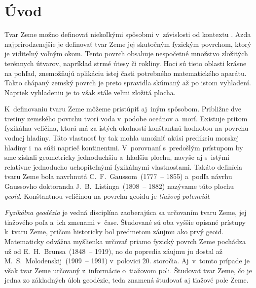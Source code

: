 \documentclass[a4paper, 12pt]{book}
\begin{document}
\tableofcontents
\newpage







\chapter*{Úvod}
\label{sec:introduction}

Tvar Zeme možno definovať niekoľkými spôsobmi v~závislosti od kontextu 
\parencite{MoritzTheFigureOfTheEarth}.  Azda najprirodzenejšie je definovať 
tvar Zeme jej skutočným fyzickým povrchom, ktorý je viditeľný voľným okom.  
Tento povrch obsahuje nespočetné množstvo zložitých terénnych útvarov, 
napríklad strmé útesy či rokliny.  Hoci sú tieto oblasti krásne na pohľad, 
znemožňujú aplikáciu istej časti potrebného matematického aparátu.  Takto 
chápaný zemský povrch je preto spravidla skúmaný až po istom vyhladení.  
Napriek vyhladeniu je to však stále veľmi zložitá plocha.

K~definovaniu tvaru Zeme môžeme pristúpiť aj~iným spôsobom.  Približne dve 
tretiny zemského povrchu tvorí voda v~podobe oceánov a~morí.  Existuje pritom 
fyzikálna veličina, ktorá má za istých okolností konštantnú hodnotou na povrchu 
vodnej hladiny.  Táto vlastnosť by tak mohla umožniť akúsi predikciu morskej 
hladiny i~na súši naprieč kontinentmi.  V~porovnaní s~predošlým prístupom by 
sme získali geometricky jednoduchšiu a~hladšiu plochu, navyše aj s~istými 
relatívne jednoducho uchopiteľnými fyzikálnymi vlastnosťami.  Takáto definícia 
tvaru Zeme bola navrhnutá C.~F.~Gaussom~(1777~-- 1855) a~podľa návrhu Gaussovho 
doktoranda J.~B.~Listinga~(1808~-- 1882) nazývame túto plochu \emph{geoid}.  
Konštantnou veličinou na povrchu geoidu je \emph{tiažový potenciál}.

\emph{Fyzikálna geodézia} je vedná disciplína zaoberajúca sa určovaním tvaru 
Zeme, jej tiažového poľa a~ich zmenami v~čase.  Študované sú oba vyššie opísané 
prístupy k~tvaru Zeme, pričom historicky bol predmetom záujmu ako prvý geoid.  
Matematicky odvážna myšlienka určovať priamo fyzický povrch Zeme pochádza už od 
E.~H.~Brunsa~(1848~-- 1919), no do popredia záujmu ju dostal až 
M.~S.~Molodenskij~(1909~-- 1991) v~polovici 20. storočia.  Aj~v~tomto prípade 
je však tvar Zeme určovaný z~informácie o~tiažovom poli.  Študovať tvar Zeme, 
čo je jedna zo základných úloh geodézie, teda znamená študovať aj tiažové pole 
Zeme.
\end{document}
